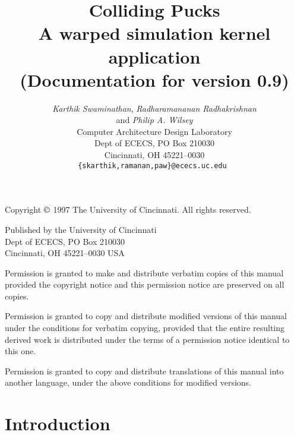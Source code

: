 
\newcommand{\version}{0.9}



\title{
Colliding Pucks\\
A {\sc warped} simulation kernel application\\
(Documentation for version \version)}

\author{
\emph{Karthik Swaminathan}, \emph{Radharamananan Radhakrishnan}\\
and \emph{Philip A. Wilsey}\\
Computer Architecture Design Laboratory \\
Dept of ECECS, PO Box 210030 \\
Cincinnati, OH  45221--0030 \\
\tt{\{skarthik,ramanan,paw\}@ececs.uc.edu}
}
 
\date{}


\maketitle

\vspace*{4in}

\noindent
Copyright $\copyright$ 1997 The University of Cincinnati.  All
rights reserved.

\bigskip

\noindent
Published by the University of Cincinnati \\
Dept of ECECS, PO Box 210030 \\
Cincinnati, OH  45221--0030 USA

\bigskip

\noindent
Permission is granted to make and distribute verbatim copies of
this manual provided the copyright notice and this permission notice
are preserved on all copies.

\medskip
\noindent
Permission is granted to copy and distribute modified versions of this
manual under the conditions for verbatim copying, provided that the entire
resulting derived work is distributed under the terms of a permission
notice identical to this one.

\medskip
\noindent
Permission is granted to copy and distribute translations of this manual
into another language, under the above conditions for modified versions.

\newpage

\section*{Introduction}

